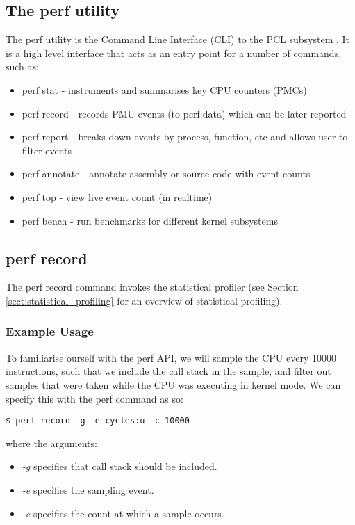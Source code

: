 \subsection{The perf utility}

The perf utility is the Command Line Interface (CLI) to the PCL subsystem \cite{ManPerfCLI}. It is a high level interface that acts as an entry point for a number of commands, such as:

\ssp
\begin{itemize}
    \item perf stat - instruments and summarises key CPU counters (PMCs)
    \item perf record - records PMU events (to perf.data) which can be later reported
    \item perf report - breaks down events by process, function, etc and allows user to filter events
    \item perf annotate - annotate assembly or source code with event counts
    \item perf top - view live event count (in realtime)
    \item perf bench - run benchmarks for different kernel subsystems
\end{itemize}
\dsp

\subsection{perf record}

The perf record command invokes the statistical profiler (see Section \ref{sect:statistical_profiling} for an overview of statistical profiling). 

\subsubsection{Example Usage}

To familiarise ourself with the perf API, we will sample the CPU every 10000 instructions, such that we include the call stack in the sample, and filter out samples that were taken while the CPU was executing in kernel mode. We can specify this with the perf command as so:

\lstset{language=bash}
\begin{lstlisting}
$ perf record -g -e cycles:u -c 10000
\end{lstlisting}

where the arguments:
\ssp
\begin{itemize}
    \item \textit{-g} specifies that call stack should be included.
    \item \textit{-e} specifies the sampling event. 
    \item \textit{-c} specifies the count at which a sample occurs. 
\end{itemize}
\dsp

